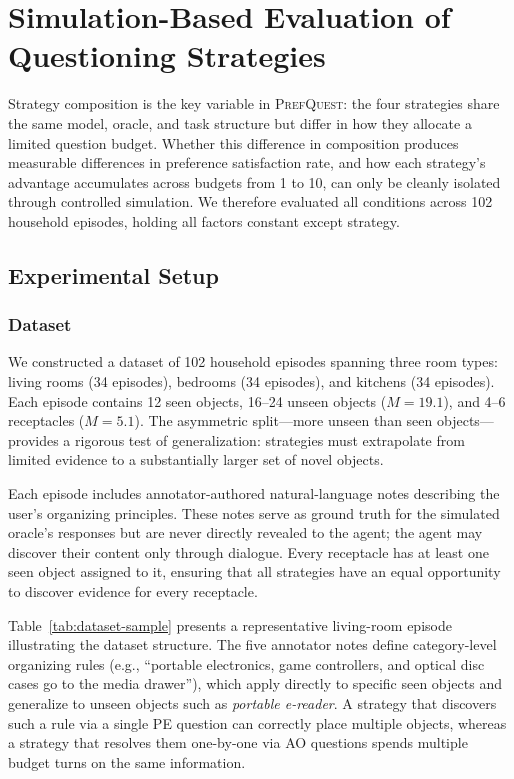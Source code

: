 \documentclass[manuscript,review,anonymous]{acmart}
\newcommand{\revstart}{\color{revcolor}}  %
\renewcommand{\revstart}{}
\begin{document}
\section{Simulation-Based Evaluation of Questioning Strategies}
\label{sec:study1}
{\revstart

Strategy composition is the key variable in \textsc{PrefQuest}: the four strategies share the same model, oracle, and task structure but differ in how they allocate a limited question budget. Whether this difference in composition produces measurable differences in preference satisfaction rate, and how each strategy's advantage accumulates across budgets from 1 to 10, can only be cleanly isolated through controlled simulation. We therefore evaluated all conditions across 102 household episodes, holding all factors constant except strategy.

\subsection{Experimental Setup}

\subsubsection{Dataset}

We constructed a dataset of 102 household episodes spanning three room types: living rooms (34 episodes), bedrooms (34 episodes), and kitchens (34 episodes). Each episode contains 12 seen objects, 16--24 unseen objects ($M = 19.1$), and 4--6 receptacles ($M = 5.1$). The asymmetric split---more unseen than seen objects---provides a rigorous test of generalization: strategies must extrapolate from limited evidence to a substantially larger set of novel objects.

Each episode includes annotator-authored natural-language notes describing the user's organizing principles. These notes serve as ground truth for the simulated oracle's responses but are never directly revealed to the agent; the agent may discover their content only through dialogue. Every receptacle has at least one seen object assigned to it, ensuring that all strategies have an equal opportunity to discover evidence for every receptacle.

Table~\ref{tab:dataset-sample} presents a representative living-room episode illustrating the dataset structure. The five annotator notes define category-level organizing rules (e.g., ``portable electronics, game controllers, and optical disc cases go to the media drawer''), which apply directly to specific seen objects and generalize to unseen objects such as \textit{portable e-reader}. A strategy that discovers such a rule via a single PE question can correctly place multiple objects, whereas a strategy that resolves them one-by-one via AO questions spends multiple budget turns on the same information.

}
\end{document}
